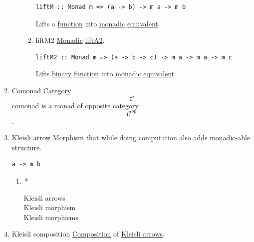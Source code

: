 \documentclass[11pt]{article}
\begin{document}
\begin{enumerate}
\begin{enumerate}
\begin{enumerate}
\begin{verbatim}
liftM :: Monad m => (a -> b) -> m a -> m b
\end{verbatim}

Lifts a \hyperref[orgeb5cddb]{function} into \hyperref[org5cc37ea]{monadic} \hyperref[org6802c96]{equivalent}.\\

\item \label{orgbab1ec7}liftM2
\label{sec:org028a42c}
\hyperref[org5cc37ea]{Monadic} \hyperref[org0673613]{liftA2}.\\
\begin{verbatim}
liftM2 :: Monad m => (a -> b -> c) -> m a -> m a -> m c
\end{verbatim}

Lifts \hyperref[orgee106ab]{binary} \hyperref[orgeb5cddb]{function} into \hyperref[org5cc37ea]{monadic} \hyperref[org6802c96]{equivalent}.\\
\end{enumerate}
\end{enumerate}

\item \label{orga6ede47}Comonad
\label{sec:org936dc97}
\hyperref[org3e3a79b]{Category} $$ \mathcal{C} $$ \hyperref[orga6ede47]{comonad} is a \hyperref[org268aaf1]{monad} of \hyperref[org97c2d69]{opposite category} $$ \mathcal{C}^{op} $$.\\

\item \label{org4db73e5}Kleisli arrow
\label{sec:orgd08c9b7}
\hyperref[orgad99fc6]{Morphism} that while doing computation also adds \hyperref[org5cc37ea]{monadic}-able \hyperref[org93ee82c]{structure}.\\

\begin{verbatim}
a -> m b
\end{verbatim}

\begin{enumerate}
\item \emph{*}
\label{sec:org3697b4e}

\label{org9a2068d}Kleisli arrows\\
\label{org5875a3d}Kleisli morphism\\
\label{orgf45ea93}Kleisli morphisms\\
\end{enumerate}

\item \label{org2eea7d7}Kleisli composition
\label{sec:orgd4c25bb}
\hyperref[org24a8abd]{Composition} of \hyperref[org9a2068d]{Kleisli arrows}.\\


\end{enumerate}
\end{document}
